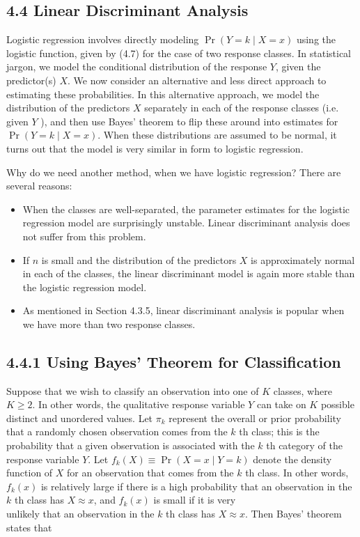\documentclass[10pt]{article}
\begin{document}
\subsection*{4.4 Linear Discriminant Analysis}
Logistic regression involves directly modeling $\operatorname{Pr}(Y=k \mid X=x)$ using the logistic function, given by (4.7) for the case of two response classes. In statistical jargon, we model the conditional distribution of the response $Y$, given the predictor(s) $X$. We now consider an alternative and less direct approach to estimating these probabilities. In this alternative approach, we model the distribution of the predictors $X$ separately in each of the response classes (i.e. given $Y$ ), and then use Bayes' theorem to flip these around into estimates for $\operatorname{Pr}(Y=k \mid X=x)$. When these distributions are assumed to be normal, it turns out that the model is very similar in form to logistic regression.

Why do we need another method, when we have logistic regression? There are several reasons:

\begin{itemize}
  \item When the classes are well-separated, the parameter estimates for the logistic regression model are surprisingly unstable. Linear discriminant analysis does not suffer from this problem.
  \item If $n$ is small and the distribution of the predictors $X$ is approximately normal in each of the classes, the linear discriminant model is again more stable than the logistic regression model.
  \item As mentioned in Section 4.3.5, linear discriminant analysis is popular when we have more than two response classes.
\end{itemize}

\subsection*{4.4.1 Using Bayes' Theorem for Classification}
Suppose that we wish to classify an observation into one of $K$ classes, where $K \geq 2$. In other words, the qualitative response variable $Y$ can take on $K$ possible distinct and unordered values. Let $\pi_{k}$ represent the overall or prior probability that a randomly chosen observation comes from the $k$ th class; this is the probability that a given observation is associated with the $k$ th category of the response variable $Y$. Let $f_{k}(X) \equiv \operatorname{Pr}(X=x \mid Y=k)$ denote the density function of $X$ for an observation that comes from the $k$ th class. In other words, $f_{k}(x)$ is relatively large if there is a high probability that an observation in the $k$ th class has $X \approx x$, and $f_{k}(x)$ is small if it is very\\
unlikely that an observation in the $k$ th class has $X \approx x$. Then Bayes' theorem states that
\end{document}
